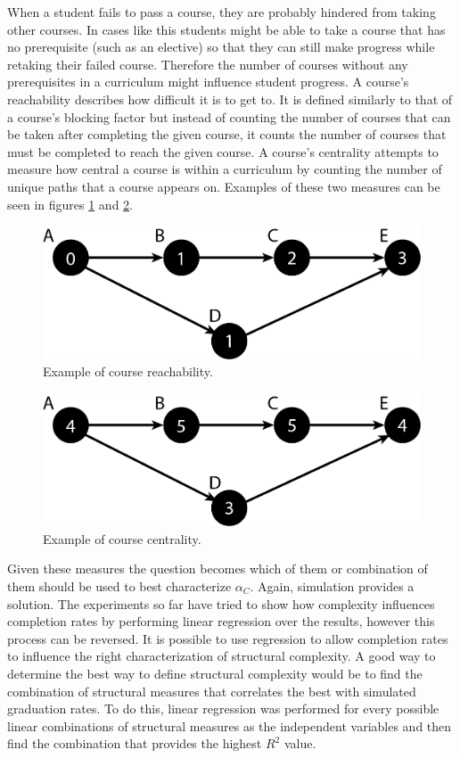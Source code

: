 \documentclass[botnum, fleqn]{unmeethesis}
\begin{document}
      When a student fails to pass a course, they are probably hindered from taking other courses. In cases like this students might be able to take a course that has no prerequisite (such as an elective) so that they can still make progress while retaking their failed course. Therefore the number of courses without any prerequisites in a curriculum might influence student progress. A course's reachability describes how difficult it is to get to. It is defined similarly to that of a course's blocking factor but instead of counting the number of courses that can be taken after completing the given course, it counts the number of courses that must be completed to reach the given course. A course's centrality attempts to measure how central a course is within a curriculum by counting the number of unique paths that a course appears on. Examples of these two measures can be seen in figures \ref{fig:Reachability} and \ref{fig:Centrality}.

      \begin{figure}
        \centering
        \includegraphics[width=0.4\linewidth]{./figures/Reachability.png}
        \caption{Example of course reachability.}
        \label{fig:Reachability}
      \end{figure}
      \vspace{0.5in}

      \begin{figure}
        \centering
        \includegraphics[width=0.4\linewidth]{./figures/Centrality.png}
        \caption{Example of course centrality.}
        \label{fig:Centrality}
      \end{figure}

      Given these measures the question becomes which of them or combination of them should be used to best characterize $\alpha_C$. Again, simulation provides a solution. The experiments so far have tried to show how complexity influences completion rates by performing linear regression over the results, however this process can be reversed. It is possible to use regression to allow completion rates to influence the right characterization of structural complexity. A good way to determine the best way to define structural complexity would be to find the combination of structural measures that correlates the best with simulated graduation rates. To do this, linear regression was performed for every possible linear combinations of structural measures as the independent variables and then find the combination that provides the highest $R^2$ value.
\end{document}
